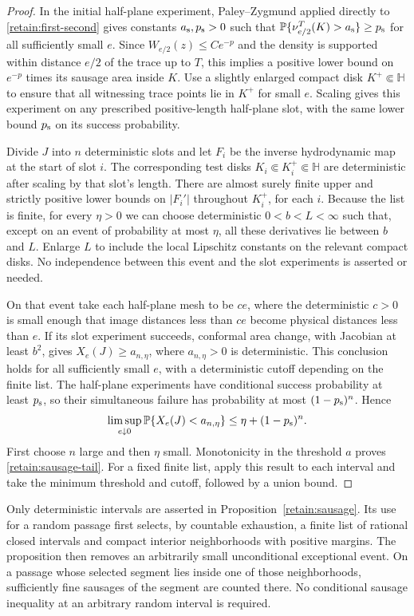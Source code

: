 \documentclass[11pt]{article}
\theoremstyle{definition}
\theoremstyle{remark}
\numberwithin{equation}{section}
\begin{document}
\begin{proof}
In the initial half-plane experiment, Paley--Zygmund applied directly
to \eqref{retain:first-second} gives constants $a_{\rm s},p_{\rm s}>0$
such that $\mathbb P\{\nu_{e/2}^T(K)>a_{\rm s}\}\ge p_{\rm s}$
for all sufficiently small $e$.  Since
$W_{e/2}(z)\le Ce^{-p}$ and the density is supported within distance
$e/2$ of the trace up to $T$, this implies a positive lower bound on
$e^{-p}$ times its sausage area inside $K$.  Use a slightly enlarged
compact disk $K^+\Subset\mathbb H$ to ensure that all witnessing
trace points lie in $K^+$ for small $e$.  Scaling gives this
experiment on any prescribed positive-length half-plane slot,
with the same lower bound $p_{\rm s}$ on its success probability.

Divide $J$ into $n$ deterministic slots and let $F_i$ be the inverse
hydrodynamic map at the start of slot $i$.  The corresponding test
disks $K_i\Subset K_i^+\Subset\mathbb H$ are deterministic after
scaling by that slot's length.  There are almost surely finite upper
and strictly positive lower bounds on $|F_i'|$ throughout $K_i^+$,
for each $i$.  Because the list is finite, for every $\eta>0$ we can
choose deterministic $0<b<L<\infty$ such that, except on an event
of probability at most $\eta$, all these derivatives lie between
$b$ and $L$.  Enlarge $L$ to include the local Lipschitz constants on
the relevant compact disks.  No independence between this event and
the slot experiments is asserted or needed.

On that event take each half-plane mesh to be $ce$, where the
deterministic $c>0$ is small enough that image distances less than
$ce$ become physical distances less than $e$.  If its slot
experiment succeeds, conformal area change, with Jacobian at least
$b^2$, gives $X_e(J)\ge a_{n,\eta}$, where $a_{n,\eta}>0$ is
deterministic.  This conclusion holds for all sufficiently small
$e$, with a deterministic cutoff depending on the finite list.
The half-plane experiments have conditional success probability at
least $p_{\rm s}$, so their simultaneous failure has probability at most
$(1-p_{\rm s})^n$.  Hence
\[
 \limsup_{e\downarrow0}\mathbb P\{X_e(J)<a_{n,\eta}\}
 \le\eta+(1-p_{\rm s})^n.
\]
First choose $n$ large and then $\eta$ small.  Monotonicity in the
threshold $a$ proves \eqref{retain:sausage-tail}.  For a fixed finite
list, apply this result to each interval and take the minimum
threshold and cutoff, followed by a union bound.
\end{proof}

Only deterministic intervals are asserted in
Proposition~\ref{retain:sausage}.  Its use for a random passage first
selects, by countable exhaustion, a finite list of rational closed
intervals and compact interior neighborhoods with positive margins.
The proposition then removes an arbitrarily small unconditional
exceptional event.  On a passage whose selected segment lies inside
one of those neighborhoods, sufficiently fine sausages of the segment
are counted there.  No conditional sausage inequality at an arbitrary
random interval is required.
\end{document}
